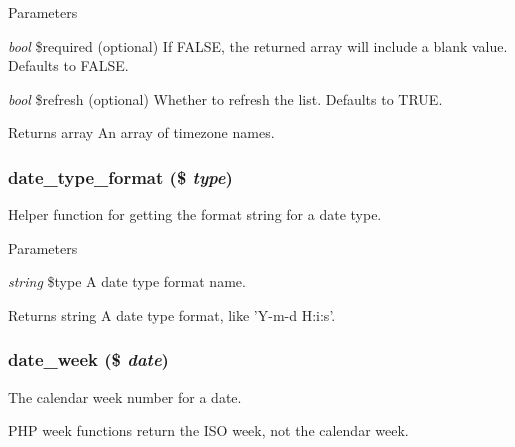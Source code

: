 \begin{DoxyParams}{Parameters}
\item[{\em bool}]\$required (optional) If FALSE, the returned array will include a blank value. Defaults to FALSE. \item[{\em bool}]\$refresh (optional) Whether to refresh the list. Defaults to TRUE.\end{DoxyParams}
\begin{DoxyReturn}{Returns}
array An array of timezone names. 
\end{DoxyReturn}
\hypertarget{date__api_8module_a9129ade471056bcb658af815dfbc3258}{
\subsubsection[{date\_\-type\_\-format}]{\setlength{\rightskip}{0pt plus 5cm}date\_\-type\_\-format (\$ {\em type})}}
\label{date__api_8module_a9129ade471056bcb658af815dfbc3258}
Helper function for getting the format string for a date type.


\begin{DoxyParams}{Parameters}
\item[{\em string}]\$type A date type format name.\end{DoxyParams}
\begin{DoxyReturn}{Returns}
string A date type format, like 'Y-\/m-\/d H:i:s'. 
\end{DoxyReturn}
\hypertarget{date__api_8module_aad517bbfed52d465074d1a880050f683}{
\subsubsection[{date\_\-week}]{\setlength{\rightskip}{0pt plus 5cm}date\_\-week (\$ {\em date})}}
\label{date__api_8module_aad517bbfed52d465074d1a880050f683}
The calendar week number for a date.

PHP week functions return the ISO week, not the calendar week.


